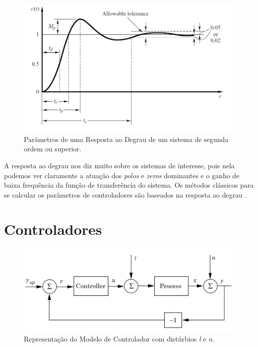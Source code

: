 \begin{figure}[htb]
  \caption{Parâmetros de uma Resposta ao Degrau de um sistema de segunda ordem ou superior.}
  \begin{center}
      \includegraphics[scale=0.5]{img/transient_ogata_p170}
  \end{center}
  \label{fig:transient_ogata_p170}
\end{figure}

A resposta ao degrau nos diz muito sobre os sistemas de interesse, pois nela podemos ver claramente a atuação dos \textit{polos} e \textit{zeros} dominantes e o ganho de baixa frequência da função de transferência do sistema. Os métodos clássicos para se calcular os parâmetros de controladores são baseados na resposta ao degrau . 

\section{Controladores}

\begin{figure}[htb]
  \caption{Representação do Modelo de Controlador com distúrbios \textit{l} e \textit{n}.}
  \begin{center}
      \includegraphics[scale=0.65]{img/feedback_loop_astrom_p65}
  \end{center}
  \label{fig:feedback_loop_astrom_p65}
\end{figure}


